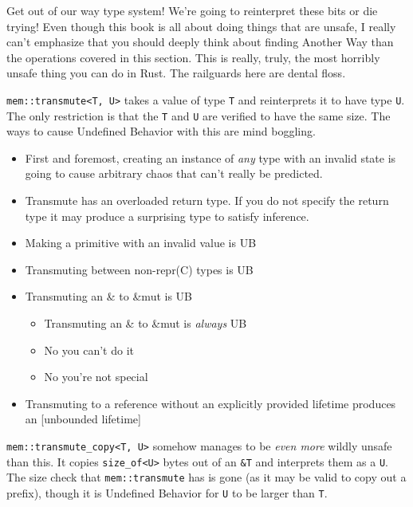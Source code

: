\documentclass[a4paper,]{book}
\providecommand{\tightlist}{%
  \setlength{\itemsep}{0pt}\setlength{\parskip}{0pt}}
\begin{document}
Get out of our way type system! We're going to reinterpret these bits or
die trying! Even though this book is all about doing things that are
unsafe, I really can't emphasize that you should deeply think about
finding Another Way than the operations covered in this section. This is
really, truly, the most horribly unsafe thing you can do in Rust. The
railguards here are dental floss.

\texttt{mem::transmute\textless{}T,\ U\textgreater{}} takes a value of
type \texttt{T} and reinterprets it to have type \texttt{U}. The only
restriction is that the \texttt{T} and \texttt{U} are verified to have
the same size. The ways to cause Undefined Behavior with this are mind
boggling.

\begin{itemize}
\tightlist
\item
  First and foremost, creating an instance of \emph{any} type with an
  invalid state is going to cause arbitrary chaos that can't really be
  predicted.
\item
  Transmute has an overloaded return type. If you do not specify the
  return type it may produce a surprising type to satisfy inference.
\item
  Making a primitive with an invalid value is UB
\item
  Transmuting between non-repr(C) types is UB
\item
  Transmuting an \& to \&mut is UB

  \begin{itemize}
  \tightlist
  \item
    Transmuting an \& to \&mut is \emph{always} UB
  \item
    No you can't do it
  \item
    No you're not special
  \end{itemize}
\item
  Transmuting to a reference without an explicitly provided lifetime
  produces an {[}unbounded lifetime{]}
\end{itemize}

\texttt{mem::transmute\_copy\textless{}T,\ U\textgreater{}} somehow
manages to be \emph{even more} wildly unsafe than this. It copies
\texttt{size\_of\textless{}U\textgreater{}} bytes out of an \texttt{\&T}
and interprets them as a \texttt{U}. The size check that
\texttt{mem::transmute} has is gone (as it may be valid to copy out a
prefix), though it is Undefined Behavior for \texttt{U} to be larger
than \texttt{T}.
\end{document}
